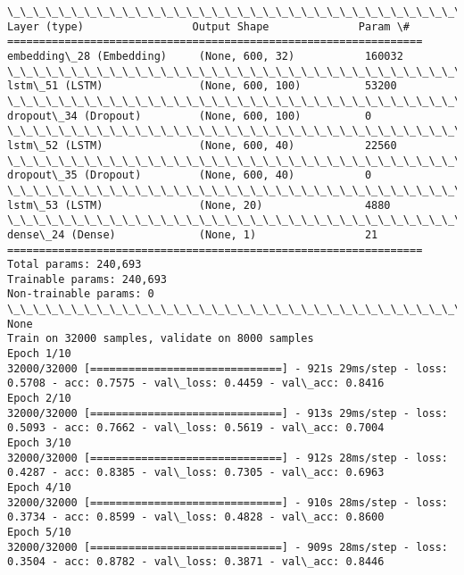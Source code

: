 \documentclass[11pt]{article}
\begin{document}
    \begin{Verbatim}[commandchars=\\\{\}]
\_\_\_\_\_\_\_\_\_\_\_\_\_\_\_\_\_\_\_\_\_\_\_\_\_\_\_\_\_\_\_\_\_\_\_\_\_\_\_\_\_\_\_\_\_\_\_\_\_\_\_\_\_\_\_\_\_\_\_\_\_\_\_\_\_
Layer (type)                 Output Shape              Param \#   
=================================================================
embedding\_28 (Embedding)     (None, 600, 32)           160032    
\_\_\_\_\_\_\_\_\_\_\_\_\_\_\_\_\_\_\_\_\_\_\_\_\_\_\_\_\_\_\_\_\_\_\_\_\_\_\_\_\_\_\_\_\_\_\_\_\_\_\_\_\_\_\_\_\_\_\_\_\_\_\_\_\_
lstm\_51 (LSTM)               (None, 600, 100)          53200     
\_\_\_\_\_\_\_\_\_\_\_\_\_\_\_\_\_\_\_\_\_\_\_\_\_\_\_\_\_\_\_\_\_\_\_\_\_\_\_\_\_\_\_\_\_\_\_\_\_\_\_\_\_\_\_\_\_\_\_\_\_\_\_\_\_
dropout\_34 (Dropout)         (None, 600, 100)          0         
\_\_\_\_\_\_\_\_\_\_\_\_\_\_\_\_\_\_\_\_\_\_\_\_\_\_\_\_\_\_\_\_\_\_\_\_\_\_\_\_\_\_\_\_\_\_\_\_\_\_\_\_\_\_\_\_\_\_\_\_\_\_\_\_\_
lstm\_52 (LSTM)               (None, 600, 40)           22560     
\_\_\_\_\_\_\_\_\_\_\_\_\_\_\_\_\_\_\_\_\_\_\_\_\_\_\_\_\_\_\_\_\_\_\_\_\_\_\_\_\_\_\_\_\_\_\_\_\_\_\_\_\_\_\_\_\_\_\_\_\_\_\_\_\_
dropout\_35 (Dropout)         (None, 600, 40)           0         
\_\_\_\_\_\_\_\_\_\_\_\_\_\_\_\_\_\_\_\_\_\_\_\_\_\_\_\_\_\_\_\_\_\_\_\_\_\_\_\_\_\_\_\_\_\_\_\_\_\_\_\_\_\_\_\_\_\_\_\_\_\_\_\_\_
lstm\_53 (LSTM)               (None, 20)                4880      
\_\_\_\_\_\_\_\_\_\_\_\_\_\_\_\_\_\_\_\_\_\_\_\_\_\_\_\_\_\_\_\_\_\_\_\_\_\_\_\_\_\_\_\_\_\_\_\_\_\_\_\_\_\_\_\_\_\_\_\_\_\_\_\_\_
dense\_24 (Dense)             (None, 1)                 21        
=================================================================
Total params: 240,693
Trainable params: 240,693
Non-trainable params: 0
\_\_\_\_\_\_\_\_\_\_\_\_\_\_\_\_\_\_\_\_\_\_\_\_\_\_\_\_\_\_\_\_\_\_\_\_\_\_\_\_\_\_\_\_\_\_\_\_\_\_\_\_\_\_\_\_\_\_\_\_\_\_\_\_\_
None
Train on 32000 samples, validate on 8000 samples
Epoch 1/10
32000/32000 [==============================] - 921s 29ms/step - loss: 0.5708 - acc: 0.7575 - val\_loss: 0.4459 - val\_acc: 0.8416
Epoch 2/10
32000/32000 [==============================] - 913s 29ms/step - loss: 0.5093 - acc: 0.7662 - val\_loss: 0.5619 - val\_acc: 0.7004
Epoch 3/10
32000/32000 [==============================] - 912s 28ms/step - loss: 0.4287 - acc: 0.8385 - val\_loss: 0.7305 - val\_acc: 0.6963
Epoch 4/10
32000/32000 [==============================] - 910s 28ms/step - loss: 0.3734 - acc: 0.8599 - val\_loss: 0.4828 - val\_acc: 0.8600
Epoch 5/10
32000/32000 [==============================] - 909s 28ms/step - loss: 0.3504 - acc: 0.8782 - val\_loss: 0.3871 - val\_acc: 0.8446

\end{Verbatim}
\end{document}

